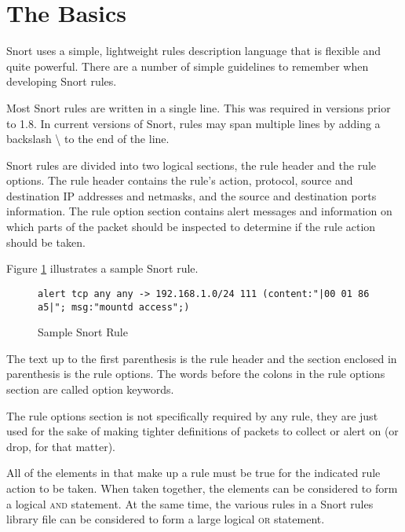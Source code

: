 \documentclass[english]{report}
\newenvironment{note}{
    \vspace{10pt}{\textsf{
        {\Huge{$\triangle$\hspace{-12.5pt}{\Large{$^!$}}}}\hspace{5pt}
        {\Large{NOTE}}
    }
    }

    \begin{center}
    \par\vspace{-10pt}
    \begin{lrbox}{\savepar}
    \begin{minipage}[r]{6.2in}
}
{
    \end{minipage}
    \end{lrbox}
    \fbox{
        \usebox{
            \savepar
        }
    }
    \par\vskip10pt
    \end{center}
}
\begin{document}
\section{The Basics}

Snort uses a simple, lightweight rules description language that is flexible
and quite powerful. There are a number of simple guidelines to remember when
developing Snort rules.

Most Snort rules are written in a single line. This was required in versions
prior to 1.8. In current versions of Snort, rules may span multiple lines by
adding a backslash \textbackslash{} to the end of the line. 

Snort rules are divided into two logical sections, the rule header and the rule
options. The rule header contains the rule's action, protocol, source and
destination IP addresses and netmasks, and the source and destination ports
information. The rule option section contains alert messages and information on
which parts of the packet should be inspected to determine if the rule action
should be taken.

Figure \ref{sample snort rule} illustrates a sample Snort rule.

\begin{center}
\begin{figure}[!hbpt]
\begin{verbatim}
alert tcp any any -> 192.168.1.0/24 111 (content:"|00 01 86 a5|"; msg:"mountd access";)
\end{verbatim}

\caption{Sample Snort Rule\label{sample snort rule}}
\end{figure}
\end{center}

The text up to the first parenthesis is the rule header and the section
enclosed in parenthesis is the rule options. The words before the
colons in the rule options section are called option keywords. 

\begin{note}
The rule options section is not specifically required by any
rule, they are just used for the sake of making tighter definitions
of packets to collect or alert on (or drop, for that matter). 
\end{note}

All of the elements in that make up a rule must be true for the indicated
rule action to be taken. When taken together, the elements can be
considered to form a logical \textsc{and} statement. At the same time,
the various rules in a Snort rules library file can be considered
to form a large logical \textsc{or} statement. 
\end{document}

